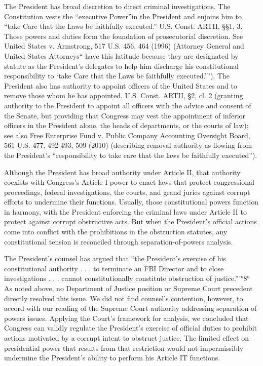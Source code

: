 The President has broad discretion to direct criminal investigations. 
The Constitution vests the “executive Power”in the President and enjoins him to “take Care that the Laws be faithfully executed.” U.S. Const. ARTII, \S\S 1, 3. 
Those powers and duties form the foundation of prosecutorial discretion. 
See United States v. Armstrong, 517 U.S. 456, 464 (1996) (Attorney General and United States Attorneys“ have this latitude because they are designated by statute as the President’s delegates to help him discharge his constitutional responsibility to ‘take Care that the Laws be faithfully executed.’”), The President also has authority to appoint officers of the United States and to remove those whom he has appointed. U.S. Const. ARTII, \S 2, cl. 2 (granting authority to the President to appoint all officers with the advice and consent of the Senate, but providing that Congress may vest the appointment of inferior officers in the President alone, the heads of departments, or the courts of law); 
see also Free Enterprise Fund v. Public Company Accounting Oversight Board, 561 U.S. 477, 492-493, 509 (2010) (describing removal authority as flowing from the President’s “responsibility to take care that the laws be faithfully executed”). 

Although the President has broad authority under Article II, that authority coexists with Congress’s Article I power to enact laws that protect congressional proceedings, federal investigations, the courts, and grand juries against corrupt efforts to undermine their functions. 
Usually, those constitutional powers function in harmony, with the President enforcing the criminal laws under Article II to protect against corrupt obstructive acts. 
But when the President’s official actions come into conflict with the prohibitions in the obstruction statutes, any constitutional tension is reconciled through separation-of-powers analysis. 

The President’s counsel has argued that “the President’s exercise of his constitutional authority . . . to terminate an FBI Director and to close investigations . . . cannot constitutionally constitute obstruction of justice.”'°8° As noted above, no Department of Justice position or Supreme Court precedent directly resolved this issue. 
We did not find counsel’s contention, however, to accord with our reading of the Supreme Court authority addressing separation-of-powers issues. 
Applying the Court’s framework for analysis, we concluded that Congress can validly regulate the President’s exercise of official duties to prohibit actions motivated by a corrupt intent to obstruct justice. 
The limited effect on presidential power that results from that restriction would not impermissibly undermine the President’s ability to perform his Article IT functions.

